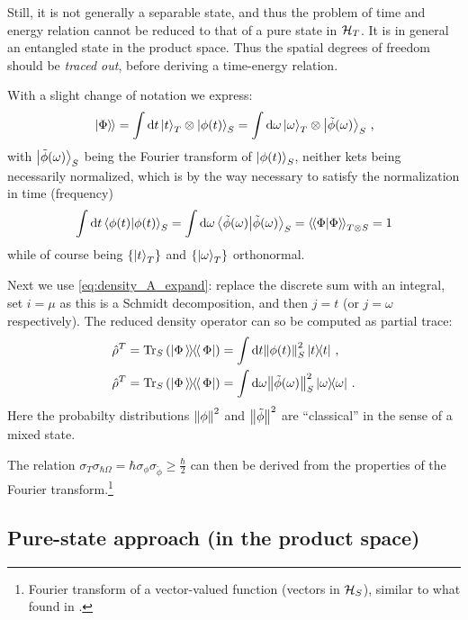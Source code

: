 Still, it is not generally
a separable state,
and thus
the problem of time and energy relation cannot be reduced to that of
a pure state in $\mathcal{H}_T$.
It is in general an entangled state in the product space.
Thus the spatial degrees of freedom should be \emph{traced out},
before deriving a time-energy relation.

With a slight change of notation we express:
\begin{equation}
  \left.\left| \Phi \right\rangle\hspace{-0.115em}\right\rangle =
    \int \dd{t} \ket{t}_T \otimes \ket{\phi(t)}_S =
    \int \dd\omega \ket{\omega}_T \otimes \ket{\tilde{\phi}(\omega)}_S \, \text{,}
\end{equation}
with $\ket{\tilde{\phi}(\omega)}_S$ being the Fourier transform
of $\ket{\phi(t)}_S$,
neither kets being necessarily normalized, which is by the way necessary
to satisfy the normalization in time (frequency)
\[
  \int \dd{t} \braket{\phi(t)}_S =
    \int \dd{\omega} \braket{\tilde{\phi}(\omega)}_S =
    \left\langle\hspace{-0.115em}\left\langle \Phi \middle| \Phi \right\rangle\hspace{-0.115em}\right\rangle_{T \otimes S} = 
    1
\]
while of course being $\left\{\ket{t}_T\right\}$ and $\left\{\ket{\omega}_T\right\}$
orthonormal.

Next we use \eqref{eq:density_A_expand}: replace the discrete sum with an integral,
set $i = \mu$ as this is a Schmidt decomposition, and then $j = t$
(or $j = \omega$ respectively).
The reduced density operator can so be computed
as partial trace:
\begin{align}
  \label{eq:ptrace_density_matrix_t}
  \hat{\rho}^T = \Tr_S\qty(\left| \Phi \left\rangle\hspace{-0.115em}\left\rangle \hspace{-0.115em} \right\langle\hspace{-0.115em}\right\langle \Phi \right|) &= \int \dd t \norm{\phi(t)}^2_S \ketbra{t}{t}
    \, \text{,}
  \\
  \label{eq:ptrace_density_matrix_omega}
  \hat{\rho}^T = \Tr_S\qty(\left| \Phi \left\rangle\hspace{-0.115em}\left\rangle \hspace{-0.115em} \right\langle\hspace{-0.115em}\right\langle \Phi \right|) &= \int \dd \omega \norm{\tilde{\phi}(\omega)}^2_S \ketbra{\omega}{\omega}
    \,\text{.} 
\end{align}
Here the probabilty distributions $\norm{\phi}^2$ and $\norm{\tilde{\phi}}^2$
are ``classical'' in the sense of a mixed state.

The relation $\sigma_T\sigma_{\hbar\Omega} = \hbar \sigma_{\phi} \sigma_{\tilde{\phi}} \geq \frac{\hbar}{2}$
can then be derived from the properties of the Fourier transform.\footnote{
  Fourier transform of a
  vector-valued function
  (vectors in $\mathcal{H}_S$),
  similar to what found in \cite{Maccone:Pauli}.
}

\subsection*{Pure-state approach (in the product space)}

